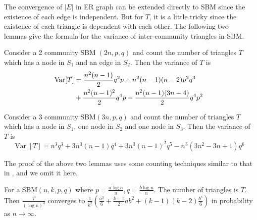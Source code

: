 \documentclass[entropy,article,submit,moreauthors,pdftex]{Definitions/mdpi}
\newcommand{\1}{\mathbbm{1}}
\DeclareMathOperator{\Var}{Var}
\begin{document}
The convergence of $|E|$ in ER graph can be extended directly to SBM since the existence of each edge is independent.
But for $T$, it is a little tricky since the existence of each triangle is dependent with each other. The following two lemmas
give the formula for the variance of inter-community triangles in SBM.
\begin{Lemma}\label{lem:SBM_tr_counting_cross}
	Consider a 2 community SBM $(2n, p, q)$ and count the number of triangles $T$ which has a node in $S_1$ and an edge in $S_2$.
Then the variance of $T$ is
\begin{align}
\Var[T] & = \frac{n^2(n-1)}{2}q^2p + n^2(n-1)(n-2)p^2q^3 \notag \\
& + \frac{n^2(n-1)^2}{2}q^4p - \frac{n^2(n-1)(3n-4)}{2}q^4 p^2 \label{eq:SBM_tr_counting_cross}
\end{align}
\end{Lemma}
\begin{Lemma}\label{lem:SBM_tr_counting_3}
	Consider a 3 community SBM$(3n, p, q)$ and count the number of triangles $T$ which has a node in $S_1$, one node in $S_2$ and one node in $S_3$.
	Then the variance of $T$ is
	\begin{equation*}\label{eq:SBM_tr_counting_three}
	\Var[T] = n^3 q^3  + 3n^3(n-1) q^4  + 3 n^3 (n-1)^2 q^5 - n^3(3n^2-3n+1)q^6
	\end{equation*}
\end{Lemma}
The proof of the above two lemmas uses some counting techniques similar to that in \cite{holland1977method}, and we omit it here.
\begin{Lemma}\label{lem:sbmV}
	For a SBM$(n, k, p, q)$ where $p=\frac{a\log n}{n}, q = \frac{b\log n}{n}$. The number of triangles is $T$.
	Then $\frac{T}{(\log n)^3}$ converges to $\frac{1}{k^2}(\frac{a^3}{6} + \frac{k-1}{2}ab^2 + (k-1)(k-2)\frac{b^3}{6} )$ in probability as $n \to \infty$.
\end{Lemma}
\end{document}
